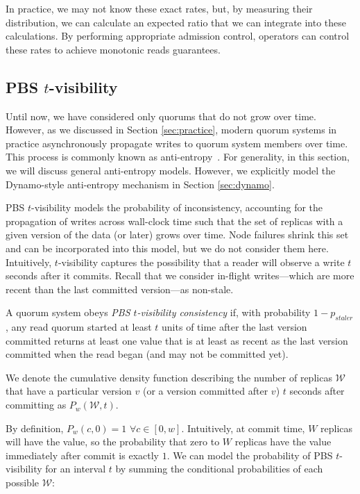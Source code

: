 \documentclass{vldb}
\begin{document}
In practice, we may not know these exact rates, but, by measuring
their distribution, we can calculate an expected ratio that we can
integrate into these calculations.  By performing appropriate
admission control, operators can control these rates to achieve
monotonic reads guarantees.

\subsection{PBS $t$-visibility}
\label{sec:tvis}


Until now, we have considered only quorums that do not grow over time.
However, as we discussed in Section \ref{sec:practice}, modern quorum
systems in practice asynchronously propagate writes to quorum system
members over time.  This process is commonly known as
anti-entropy~\cite{antientropy}.  For generality, in this section, we
will discuss general anti-entropy models. However, we explicitly model
the Dynamo-style anti-entropy mechanism in Section \ref{sec:dynamo}.

PBS $t$-visibility models the probability of inconsistency, accounting
for the propagation of writes across wall-clock time such that the set
of replicas with a given version of the data (or later) grows over
time.  Node failures shrink this set and can be incorporated into this
model, but we do not consider them here.  Intuitively, $t$-visibility
captures the possibility that a reader will observe a write $t$
seconds after it commits.  Recall that we consider in-flight
writes---which are more recent than the last committed version---as
non-stale.

\begin{definition}
A quorum system obeys \textit{PBS $t$-visibility consistency} if, with
probability $1-p_{staler}$, any read quorum started at least $t$ units
of time after the last version committed returns at least one value
that is at least as recent as the last version committed when the read
began (and may not be committed yet).
\end{definition}

We denote the cumulative density function describing the number
of replicas $\mathcal{W}$ that have a particular version $v$ (or a
version committed after $v$) $t$ seconds after committing as
$P_w(\mathcal{W}, t)$.

By definition, $P_w(c,0) = 1$ $\forall c \in [0, w]$.  Intuitively, at
commit time, $W$ replicas will have the value, so the probability that
zero to $W$ replicas have the value immediately after commit is
exactly $1$.  We can model the probability of PBS $t$-visibility for
an interval $t$ by summing the conditional probabilities of each
possible $\mathcal{W}$:
\end{document}
